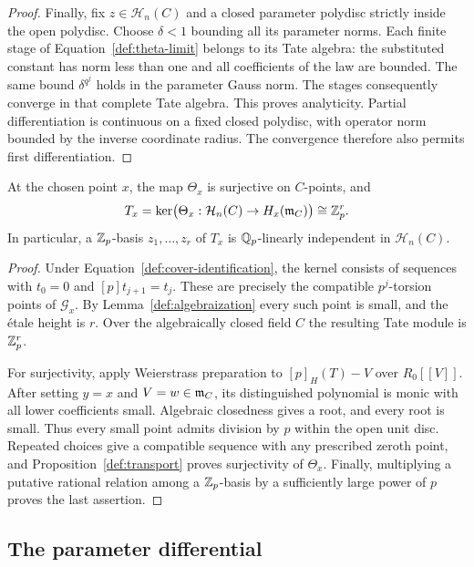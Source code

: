 \begin{proof}
Finally, fix $z\in\mathcal H_n(C)$ and a closed parameter polydisc
strictly inside the open polydisc.  Choose $\delta<1$ bounding all its
parameter norms.  Each finite stage of Equation~\eqref{def:theta-limit}
belongs to its Tate algebra: the substituted constant has norm less than
one and all coefficients of the law are bounded.  The same bound
$\delta^{q^j}$ holds in the parameter Gauss norm.  The stages consequently
converge in that complete Tate algebra.  This proves analyticity.
Partial differentiation is continuous on a fixed closed polydisc, with
operator norm bounded by the inverse coordinate radius.  The convergence
therefore also permits first differentiation.
\end{proof}

\begin{lemma}\label{def:tate-kernel}
At the chosen point $x$, the map $\Theta_x$ is surjective on $C$-points,
and
\[
 T_x=\ker\bigl(\Theta_x:\mathcal H_n(C)\to H_x(\mathfrak m_C)\bigr)
       \cong\mathbb Z_p^r.
\]
In particular, a $\mathbb Z_p$-basis $z_1,\ldots,z_r$ of $T_x$ is
$\mathbb Q_p$-linearly independent in $\mathcal H_n(C)$.
\end{lemma}

\begin{proof}
Under Equation~\eqref{def:cover-identification}, the kernel consists of
sequences with $t_0=0$ and $[p]t_{j+1}=t_j$.  These are precisely the
compatible $p^j$-torsion points of $\mathcal G_x$.  By
Lemma~\ref{def:algebraization} every such point is small, and the
\'etale height is $r$.  Over the algebraically closed field $C$ the
resulting Tate module is $\mathbb Z_p^r$.

For surjectivity, apply Weierstrass preparation to $[p]_H(T)-V$ over
$R_0[[V]]$.  After setting $y=x$ and $V=w\in\mathfrak m_C$, its distinguished
polynomial is monic with all lower coefficients small.  Algebraic
closedness gives a root, and every root is small.  Thus every small point
admits division by $p$ within the open unit disc.  Repeated choices give a
compatible sequence with any prescribed zeroth point, and
Proposition~\ref{def:transport} proves surjectivity of $\Theta_x$.
Finally, multiplying a putative rational relation among a $\mathbb Z_p$-basis by
a sufficiently large power of $p$ proves the last assertion.
\end{proof}

\subsection{The parameter differential}

